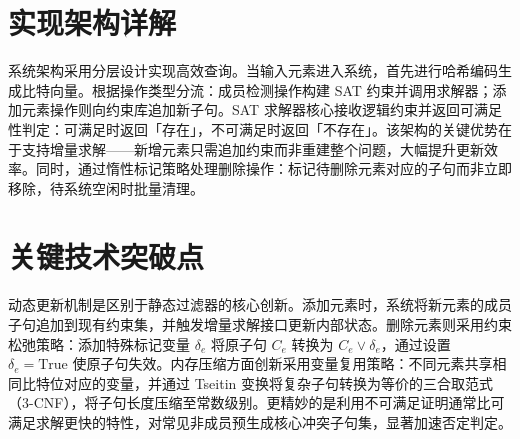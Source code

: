\chapter{实现架构详解}
系统架构采用分层设计实现高效查询。当输入元素进入系统，首先进行哈希编码生成比特向量。根据操作类型分流：成员检测操作构建 SAT 约束并调用求解器；添加元素操作则向约束库追加新子句。SAT 求解器核心接收逻辑约束并返回可满足性判定：可满足时返回「存在」，不可满足时返回「不存在」。该架构的关键优势在于支持增量求解——新增元素只需追加约束而非重建整个问题，大幅提升更新效率。同时，通过惰性标记策略处理删除操作：标记待删除元素对应的子句而非立即移除，待系统空闲时批量清理。\par
\chapter{关键技术突破点}
动态更新机制是区别于静态过滤器的核心创新。添加元素时，系统将新元素的成员子句追加到现有约束集，并触发增量求解接口更新内部状态。删除元素则采用约束松弛策略：添加特殊标记变量 $\delta_e$ 将原子句 $C_e$ 转换为 $C_e \lor \delta_e$，通过设置 $\delta_e = \text{True}$ 使原子句失效。内存压缩方面创新采用变量复用策略：不同元素共享相同比特位对应的变量，并通过 Tseitin 变换将复杂子句转换为等价的三合取范式（3-CNF），将子句长度压缩至常数级别。更精妙的是利用不可满足证明通常比可满足求解更快的特性，对常见非成员预生成核心冲突子句集，显著加速否定判定。\par
